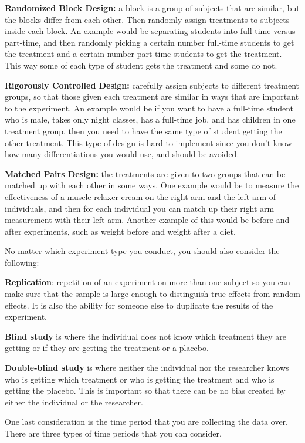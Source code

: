 \documentclass[]{book}
\begin{document}
\textbf{Randomized Block Design:} a block is a group of subjects that are similar, but the blocks differ from each other. Then randomly assign treatments to subjects inside each block. An example would be separating students into full-time versus part-time, and then randomly picking a certain number full-time students to get the treatment and a certain number part-time students to get the treatment. This way some of each type of student gets the treatment and some do not.

\textbf{Rigorously Controlled Design:} carefully assign subjects to different treatment groups, so that those given each treatment are similar in ways that are important to the experiment. An example would be if you want to have a full-time student who is male, takes only night classes, has a full-time job, and has children in one treatment group, then you need to have the same type of student getting the other treatment. This type of design is hard to implement since you don't know how many differentiations you would use, and should be avoided.

\textbf{Matched Pairs Design:} the treatments are given to two groups that can be matched up with each other in some ways. One example would be to measure the effectiveness of a muscle relaxer cream on the right arm and the left arm of individuals, and then for each individual you can match up their right arm measurement with their left arm. Another example of this would be before and after experiments, such as weight before and weight after a diet.

No matter which experiment type you conduct, you should also consider the following:

\textbf{Replication}: repetition of an experiment on more than one subject so you can make sure that the sample is large enough to distinguish true effects from random effects. It is also the ability for someone else to duplicate the results of the experiment.

\textbf{Blind study} is where the individual does not know which treatment they are getting or if they are getting the treatment or a placebo.

\textbf{Double-blind study} is where neither the individual nor the
researcher knows who is getting which treatment or who is getting the treatment and who is getting the placebo. This is important so that there can be no bias created by either the individual or the researcher.

One last consideration is the time period that you are collecting the data over. There are three types of time periods that you can consider.
\end{document}
